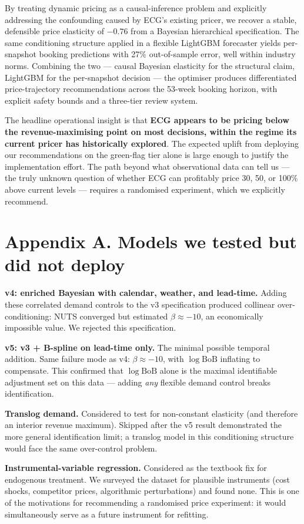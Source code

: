 \documentclass[11pt,a4paper]{article}
\begin{document}
By treating dynamic pricing as a causal-inference problem and explicitly addressing the confounding caused by ECG's existing pricer, we recover a stable, defensible price elasticity of $-0.76$ from a Bayesian hierarchical specification. The same conditioning structure applied in a flexible LightGBM forecaster yields per-snapshot booking predictions with 27\% out-of-sample error, well within industry norms. Combining the two --- causal Bayesian elasticity for the structural claim, LightGBM for the per-snapshot decision --- the optimiser produces differentiated price-trajectory recommendations across the 53-week booking horizon, with explicit safety bounds and a three-tier review system.

The headline operational insight is that \textbf{ECG appears to be pricing below the revenue-maximising point on most decisions, within the regime its current pricer has historically explored}. The expected uplift from deploying our recommendations on the green-flag tier alone is large enough to justify the implementation effort. The path beyond what observational data can tell us --- the truly unknown question of whether ECG can profitably price 30, 50, or 100\% above current levels --- requires a randomised experiment, which we explicitly recommend.

\section*{Appendix A. Models we tested but did not deploy}

\textbf{v4: enriched Bayesian with calendar, weather, and lead-time.} Adding these correlated demand controls to the v3 specification produced collinear over-conditioning: NUTS converged but estimated $\beta \approx -10$, an economically impossible value. We rejected this specification.

\textbf{v5: v3 + B-spline on lead-time only.} The minimal possible temporal addition. Same failure mode as v4: $\beta \approx -10$, with $\log\mathrm{BoB}$ inflating to compensate. This confirmed that $\log\mathrm{BoB}$ alone is the maximal identifiable adjustment set on this data --- adding \emph{any} flexible demand control breaks identification.

\textbf{Translog demand.} Considered to test for non-constant elasticity (and therefore an interior revenue maximum). Skipped after the v5 result demonstrated the more general identification limit; a translog model in this conditioning structure would face the same over-control problem.

\textbf{Instrumental-variable regression.} Considered as the textbook fix for endogenous treatment. We surveyed the dataset for plausible instruments (cost shocks, competitor prices, algorithmic perturbations) and found none. This is one of the motivations for recommending a randomised price experiment: it would simultaneously serve as a future instrument for refitting.
\end{document}
